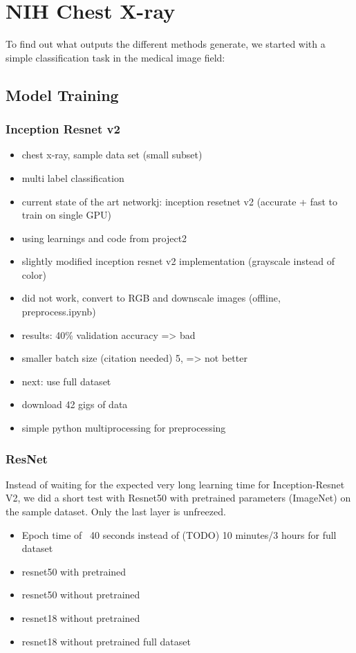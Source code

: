 \chapter{NIH Chest X-ray}
To find out what outputs the different methods generate, we started with a simple classification task in the medical image field:

\section{Model Training}
\subsection{Inception Resnet v2}
\begin{itemize}
    \item  chest x-ray, sample data set (small subset)
    \item  multi label classification
    \item  current state of the art networkj: inception  resetnet v2 (accurate + fast to train on single GPU) \cite{todo}
    \item  using learnings and code from project2
    \item  slightly modified inception resnet v2 implementation (grayscale instead of color)
    \item  did not work, convert to RGB and downscale images (offline, preprocess.ipynb)
    \item  results: 40\% validation accuracy => bad
    \item smaller batch size (citation needed) 5, => not better
    \item next: use full dataset
    \item download 42 gigs of data
    \item simple python multiprocessing for preprocessing
\end{itemize}

\subsection{ResNet}
Instead of waiting for the expected very long learning time for Inception-Resnet V2, we did a short test with Resnet50 with pretrained parameters (ImageNet) on the sample dataset. Only the last layer is unfreezed.

\begin{itemize}
    \item Epoch time of ~40 seconds instead of (TODO) 10 minutes/3 hours for full dataset
    \item resnet50 with pretrained
    \item resnet50 without pretrained
    \item resnet18 without pretrained
    \item resnet18 without pretrained full dataset
\end{itemize}

